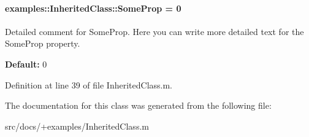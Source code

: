 \paragraph[{Some\+Prop}]{\setlength{\rightskip}{0pt plus 5cm}examples\+::\+Inherited\+Class\+::\+Some\+Prop = 0}\label{classexamples_1_1_inherited_class_ab3defe2367efa7a39a89d2cb8c8f5047}
Detailed comment for Some\+Prop. Here you can write more detailed text for the Some\+Prop property.

{\bfseries Default\+:} 0 

Definition at line 39 of file Inherited\+Class.\+m.



The documentation for this class was generated from the following file\+:\begin{DoxyCompactItemize}
\item 
src/docs/+examples/Inherited\+Class.\+m\end{DoxyCompactItemize}
